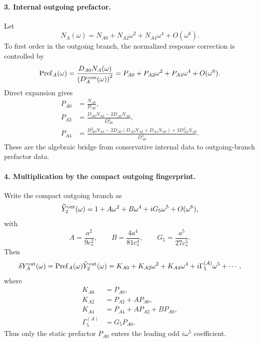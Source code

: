 \paragraph{3. Internal outgoing prefactor.}
Let
\begin{equation}
\label{eq:app-stage022-n-transfer}
N_A(\omega)=N_{A0}+N_{A2}\omega^2+N_{A4}\omega^4+O(\omega^6).
\end{equation}
To first order in the outgoing branch, the normalized response correction is controlled by
\begin{equation}
\label{eq:app-stage022-pref-def}
{\rm Pref}_A(\omega)
=\frac{D_{A0}N_A(\omega)}{\left(D_A^{\rm cons}(\omega)\right)^2}
=P_{A0}+P_{A2}\omega^2+P_{A4}\omega^4+O(\omega^6).
\end{equation}
Direct expansion gives
\begin{align}
\label{eq:app-stage022-pref-coeffs}
\boxed{P_{A0}}&=\boxed{\frac{N_{A0}}{D_{A0}}},\\
\boxed{P_{A2}}&=\boxed{\frac{D_{A0}N_{A2}-2D_{A2}N_{A0}}{D_{A0}^2}},\\
\boxed{P_{A4}}&=\boxed{\frac{D_{A0}^2N_{A4}-2D_{A0}(D_{A2}N_{A2}+D_{A4}N_{A0})+3D_{A2}^2N_{A0}}{D_{A0}^3}}.
\end{align}
These are the algebraic bridge from conservative internal data to outgoing-branch prefactor data.

\paragraph{4. Multiplication by the compact outgoing fingerprint.}
Write the compact outgoing branch as
\begin{equation}
\label{eq:app-stage022-outgoing-compact}
\widehat Y_2^{\rm out}(\omega)
=1+A\omega^2+B\omega^4+iG_5\omega^5+O(\omega^6),
\end{equation}
with
\begin{equation}
\label{eq:app-stage022-abg}
A=\frac{a^2}{9c_s^2},
\qquad
B=\frac{4a^4}{81c_s^4},
\qquad
G_5=\frac{a^5}{27c_s^5}.
\end{equation}
Then
\begin{equation}
\delta Y_A^{\rm out}(\omega)={\rm Pref}_A(\omega)\widehat Y_2^{\rm out}(\omega)
=K_{A0}+K_{A2}\omega^2+K_{A4}\omega^4+i\Gamma_5^{(A)}\omega^5+\cdots,
\end{equation}
where
\begin{align}
\label{eq:app-stage022-k-gamma}
K_{A0}&=P_{A0},\\
K_{A2}&=P_{A2}+AP_{A0},\\
K_{A4}&=P_{A4}+AP_{A2}+BP_{A0},\\
\Gamma_5^{(A)}&=G_5P_{A0}.
\end{align}
Thus only the static prefactor \(P_{A0}\) enters the leading odd \(i\omega^5\) coefficient.

